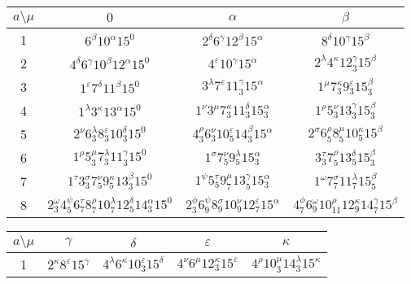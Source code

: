 \documentclass[a4paper,12pt]{report}
\begin{document}
\begin{center}

\begin{tabular}{|c|c|c|c|}\hline
 $ a\setminus\mu$    &$0$  & $\alpha$ & $\beta$ \\ \hline
1 & $6^{\beta}10^{\alpha}15^{0}$& $2^{\delta}6^{\gamma}12^{\beta}15^{\alpha}$ & $8^{\delta}10^{\gamma}15^{\beta}$ \\
\hline

2 & $4^{\delta}6^{\gamma}10^{\beta}12^{\alpha}15^{0}$ & $4^{\varepsilon}10^{\gamma}15^{\alpha}$ & $2^{\lambda}4^{\kappa}12_{3}^{\gamma}15^{\beta}$ \\
\hline

3  & $1^{\varepsilon}7^{\delta}11^{\beta}15^{0}$ & $3^{\lambda}7^{\varepsilon}11_{3}^{\gamma}15^{\alpha}$ & $1^{\mu}7_{3}^{\kappa}9_{3}^{\varepsilon}15_{3}^{\beta}$ \\
\hline

4 & $1^{\lambda}3^{\kappa}13^{\alpha}15^{0}$ & $1^{\nu}3^{\mu}7_{3}^{\kappa}11_{3}^{\delta}15_{3}^{\alpha}$ & $1^{\rho}5_{3}^{\nu}13_{3}^{\gamma}15_{3}^{\beta}$ \\
\hline

5 & $2^{\nu}6_{3}^{\lambda}8_{3}^{\varepsilon}10_{3}^{\delta}15^{0}$& $4_{3}^{\rho}6_{3}^{\nu}10_{5}^{\varepsilon}14_{3}^{\beta}15^{\alpha}$ & $2^{\sigma}6_{5}^{\rho}8_{5}^{\mu}10_{5}^{\kappa}15^{\beta}$ \\
\hline

6  &$1^{\rho}5_{3}^{\mu}7_{3}^{\lambda}11_{3}^{\gamma}15^{0}$&
$1^{\sigma}7_{5}^{\nu}9_{5}^{\lambda}15_{3}^{\alpha}$ & $3_{3}^{\tau}7_{5}^{\rho}13_{5}^{\delta}15_{3}^{\beta}$ \\
\hline

7   & $1^{\tau}3_{3}^{\sigma}7_{5}^{\nu}9_{5}^{\kappa}13_{3}^{\beta}15^{0}$& $1^{\psi}5_{5}^{\tau}9_{7}^{\mu}13_{5}^{\gamma}15_{3}^{\alpha}$ & $1^{\omega}7_{7}^{\sigma}11_{7}^{\lambda}15_{5}^{\beta}$  \\
\hline

8  & $2_{3}^{\omega}4_{5}^{\psi}6_{7}^{\tau}8_{7}^{\rho}10_{7}^{\lambda}12_{5}^{\delta}14_{3}^{\alpha}15^{0}$ & $2_{3}^{\phi}6_{9}^{\psi}8_{9}^{\sigma}10_{9}^{\nu}12_{7}^{\varepsilon}15^{\alpha}$ & $4_{7}^{\phi}6_{9}^{\omega}10_{11}^{\rho}12_{9}^{\kappa}14_{7}^{\gamma}15^{\beta}$  \\
\hline
  \end{tabular}


\begin{tabular}{|c|c|c|c|c|}\hline
 $ a\setminus\mu$   & $\gamma$ &$\delta$  & $\varepsilon$ & $\kappa$  \\ \hline
1 & $2^{\kappa}8^{\varepsilon}15^{\gamma}$ & $4^{\lambda}6^{\kappa}10_{3}^{\varepsilon}15^{\delta}$ & $4^{\nu}6^{\mu}12_{3}^{\kappa}15^{\varepsilon}$ & $4^{\rho}10_{3}^{\mu}14_{3}^{\lambda}15^{\kappa}$  \\
\hline


\end{tabular}
\end{center}
\end{document}

